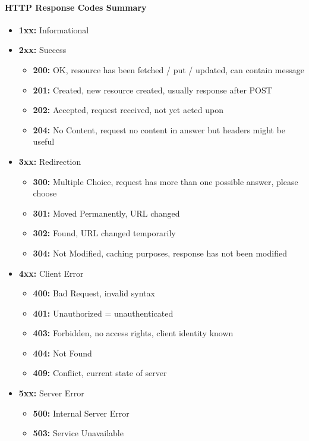 \paragraph{HTTP Response Codes Summary}
\begin{itemize}
    \item \textbf{1xx:} Informational
    \item \textbf{2xx:} Success
    \begin{itemize}
        \item \textbf{200:} OK, resource has been fetched / put / updated, can contain message
        \item \textbf{201:} Created, new resource created, usually response after POST
        \item \textbf{202:} Accepted, request received, not yet acted upon
        \item \textbf{204:} No Content, request no content in answer but headers might be useful
    \end{itemize}
    \item \textbf{3xx:} Redirection
    \begin{itemize}
        \item \textbf{300:} Multiple Choice, request has more than one possible answer, please choose
        \item \textbf{301:} Moved Permanently, URL changed
        \item \textbf{302:} Found, URL changed temporarily
        \item \textbf{304:} Not Modified, caching purposes, response has not been modified
    \end{itemize}
    \item \textbf{4xx:} Client Error
    \begin{itemize}
        \item \textbf{400:} Bad Request, invalid syntax
        \item \textbf{401:} Unauthorized = unauthenticated
        \item \textbf{403:} Forbidden, no access rights, client identity known
        \item \textbf{404:} Not Found
        \item \textbf{409:} Conflict, current state of server
    \end{itemize}
    \item \textbf{5xx:} Server Error
    \begin{itemize}
        \item \textbf{500:} Internal Server Error
        \item \textbf{503:} Service Unavailable
    \end{itemize}
\end{itemize}


